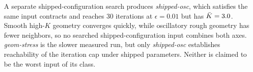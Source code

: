 A separate shipped-configuration search produces \emph{shipped-osc}, which satisfies the
same input contracts and reaches 30 iterations at $\epsilon=0.01$ but has
$\bar K=3.0$. Smooth high-$K$ geometry converges quickly, while oscillatory rough
geometry has fewer neighbors, so no searched shipped-configuration input combines both
axes. \emph{geom-stress} is the slower measured run, but only \emph{shipped-osc}
establishes reachability of the iteration cap under shipped parameters. Neither is claimed
to be the worst input of its class.
